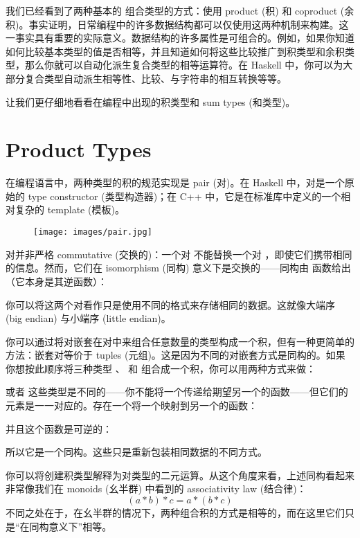 
\lettrine[lhang=0.17]{我}{们已经看到了两种基本的} 组合类型的方式：使用 product (积) 和 coproduct (余积)。事实证明，日常编程中的许多数据结构都可以仅使用这两种机制来构建。这一事实具有重要的实际意义。数据结构的许多属性是可组合的。例如，如果你知道如何比较基本类型的值是否相等，并且知道如何将这些比较推广到积类型和余积类型，那么你就可以自动化派生复合类型的相等运算符。在 Haskell 中，你可以为大部分复合类型自动派生相等性、比较、与字符串的相互转换等等。

让我们更仔细地看看在编程中出现的积类型和 sum types (和类型)。

\section{Product Types}

在编程语言中，两种类型的积的规范实现是 pair (对)。在 Haskell 中，对是一个原始的 type constructor (类型构造器)；在 C++ 中，它是在标准库中定义的一个相对复杂的 template (模板)。

\begin{figure}[H]
  \centering
  \texttt{[image: images/pair.jpg]}
\end{figure}

\noindent
对并非严格 commutative (交换的)：一个对  不能替换一个对 ，即使它们携带相同的信息。然而，它们在 isomorphism (同构) 意义下是交换的——同构由  函数给出（它本身是其逆函数）：

你可以将这两个对看作只是使用不同的格式来存储相同的数据。这就像大端序 (big endian) 与小端序 (little endian)。

你可以通过将对嵌套在对中来组合任意数量的类型构成一个积，但有一种更简单的方法：嵌套对等价于 tuples (元组)。这是因为不同的对嵌套方式是同构的。如果你想按此顺序将三种类型 、 和  组合成一个积，你可以用两种方式来做：


或者
这些类型是不同的——你不能将一个传递给期望另一个的函数——但它们的元素是一一对应的。存在一个将一个映射到另一个的函数：

并且这个函数是可逆的：

所以它是一个同构。这些只是重新包装相同数据的不同方式。

你可以将创建积类型解释为对类型的二元运算。从这个角度来看，上述同构看起来非常像我们在 monoids (幺半群) 中看到的 associativity law (结合律)：
\[(a * b) * c = a * (b * c)\]
不同之处在于，在幺半群的情况下，两种组合积的方式是相等的，而在这里它们只是“在同构意义下”相等。

